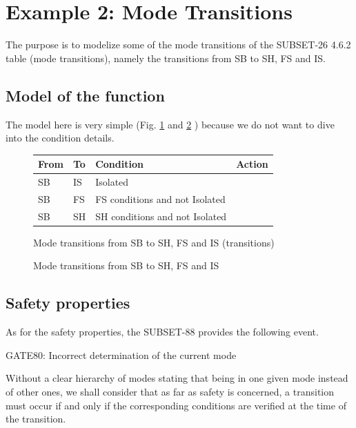 \documentclass{template/openetcs_article}
\begin{document}
\section{Example 2: Mode Transitions}
The purpose is to modelize some of the mode transitions of the SUBSET-26 4.6.2 table (mode transitions), 
namely the transitions from SB to SH, FS and IS.

\subsection{Model of the function}
The model here is very simple (Fig. \ref{fig:trans_sb_tab} and \ref{fig:trans_sb} ) 
because we do not want to dive into the condition details.

\begin{figure}
\centering
\small
\begin{tabular}{|l|l||p{3.5cm}|p{3.5cm}|}
\hline
\bf From & \bf To & \bf Condition & \bf Action \\
\hline
SB & IS & Isolated &  \\
\hline
SB & FS & FS conditions and not Isolated &  \\
\hline
SB & SH & SH conditions and not Isolated &  \\
\hline
\end{tabular}
\normalsize
\caption{Mode transitions from SB to SH, FS and IS (transitions)}
\label{fig:trans_sb_tab}
\end{figure}

\begin{figure}
  \centering
  \caption{Mode transitions from SB to SH, FS and IS}
  \label{fig:trans_sb}
\end{figure}

\subsection{Safety properties}
As for the safety properties, the SUBSET-88 provides the following event. 
\begin{center}
GATE80: Incorrect determination of the current mode
\end{center}
Without a clear hierarchy of modes stating that being in one given mode instead of other ones, we 
shall consider that as far as safety is concerned, a transition must occur if and only if the 
corresponding conditions are verified at the time of the transition.
\end{document}
